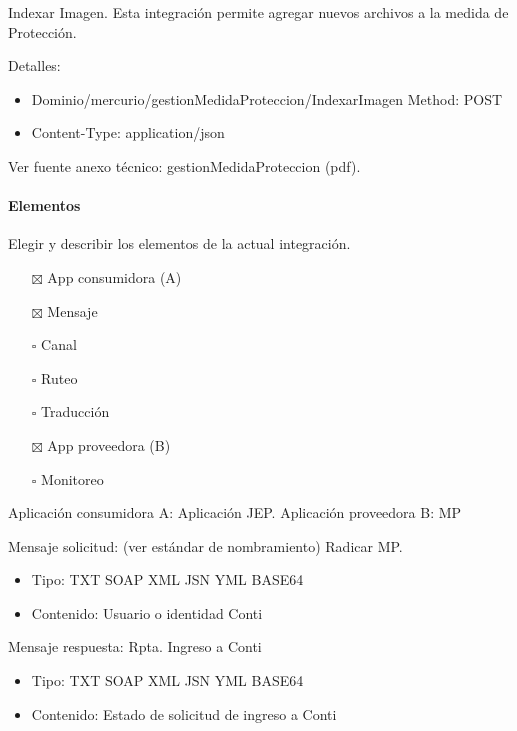 \documentclass[
  paper=a4,
  ,captions=tableheading
]{scrartcl}
\providecommand{\tightlist}{%
  \setlength{\itemsep}{0pt}\setlength{\parskip}{0pt}}
\begin{document}
Indexar Imagen. Esta integración permite agregar nuevos archivos a la
medida de Protección.

Detalles:

\begin{itemize}
\tightlist
\item
  Dominio/mercurio/gestionMedidaProteccion/IndexarImagen Method: POST
\item
  Content-Type: application/json
\end{itemize}

Ver fuente anexo técnico: gestionMedidaProteccion (pdf).

\paragraph{Elementos}\label{sec:elementos-1}

Elegir y describir los elementos de la actual integración.

\begin{itemize}
\tightlist
\item[$\boxtimes$]
  App consumidora (A)
\item[$\boxtimes$]
  Mensaje
\item[$\square$]
  Canal
\item[$\square$]
  Ruteo
\item[$\square$]
  Traducción
\item[$\boxtimes$]
  App proveedora (B)
\item[$\square$]
  Monitoreo
\end{itemize}

Aplicación consumidora A: Aplicación JEP. Aplicación proveedora B: MP

Mensaje solicitud: (ver estándar de nombramiento) Radicar MP.

\begin{itemize}
\tightlist
\item
  Tipo: TXT \textbar{} SOAP \textbar{} XML \textbar{} JSN \textbar{} YML
  \textbar{} BASE64
\item
  Contenido: Usuario o identidad Conti
\end{itemize}

Mensaje respuesta: Rpta. Ingreso a Conti

\begin{itemize}
\tightlist
\item
  Tipo: TXT \textbar{} SOAP \textbar{} XML \textbar{} JSN \textbar{} YML
  \textbar{} BASE64
\item
  Contenido: Estado de solicitud de ingreso a Conti
\end{itemize}
\end{document}

